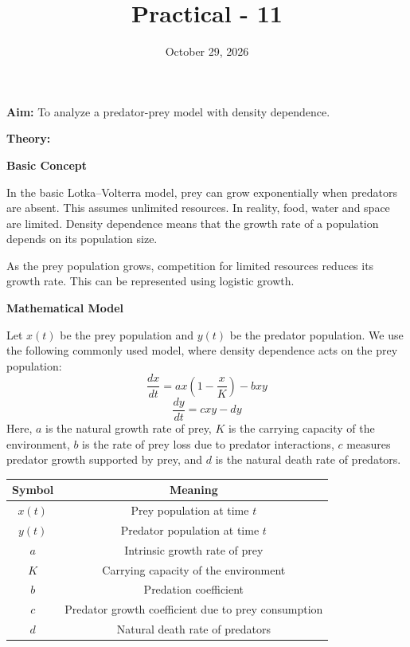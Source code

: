 \documentclass{article}
\title{\textbf{Practical - 11}}
\author{}
\date{October 29, 2026}
\begin{document}
\maketitle

\noindent
\textbf{\large{Aim:}} To analyze a predator-prey model with density dependence.

\vspace{1em}
\noindent
\textbf{\large{Theory:}}

\vspace{0.5em}
\noindent
\textbf{Basic Concept}

\noindent
In the basic Lotka–Volterra model, prey can grow exponentially when predators are absent. This assumes unlimited resources. In reality, food, water and space are limited. Density dependence means that the growth rate of a population depends on its population size.

\noindent
As the prey population grows, competition for limited resources reduces its growth rate. This can be represented using logistic growth.

\vspace{1.5em}
\noindent
\textbf{Mathematical Model}

\noindent
Let $x(t)$ be the prey population and $y(t)$ be the predator population. We use the following commonly used model, where density dependence acts on the prey population:
\[\frac{dx}{dt} = ax(1 - \frac{x}{K}) - bxy\]
\[\frac{dy}{dt} = cxy - dy\]
Here, $a$ is the natural growth rate of prey, $K$ is the carrying capacity of the environment, $b$ is the rate of prey loss due to predator interactions, $c$ measures predator growth supported by prey, and $d$ is the natural death rate of predators.

\begin{table}[h]
    \centering
    \begin{tabular}{|c|c|}
    \hline
    \textbf{Symbol} & \textbf{Meaning} \\
    \hline
    \textbf{$x(t)$} & Prey population at time $t$ \\
    \hline
    \textbf{$y(t)$} & Predator population at time $t$ \\
    \hline
    \textbf{$a$} & Intrinsic growth rate of prey \\
    \hline
    \textbf{$K$} & Carrying capacity of the environment \\
    \hline
    \textbf{$b$} & Predation coefficient \\
    \hline
    \textbf{$c$} & Predator growth coefficient due to prey consumption \\
    \hline
    \textbf{$d$} & Natural death rate of predators \\
    \hline
    \end{tabular}
\end{table}
\end{document}
